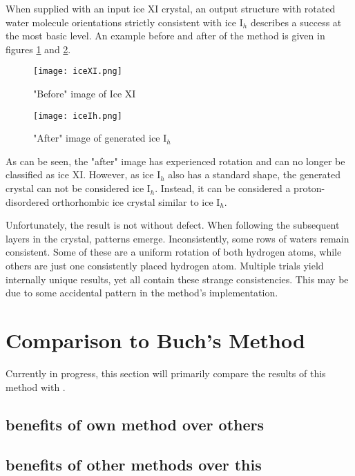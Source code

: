 When supplied with an input ice XI crystal, an output structure with rotated water molecule orientations strictly consistent with ice I$_{h}$ describes a success at the most basic level.
An example before and after of the method is given in figures \ref{fig:iceXI} and \ref{fig:iceIh}.
\begin{figure}
	
	\centering
	
	\texttt{[image: iceXI.png]}
	
	\caption{"Before" image of Ice XI}
	
	\label{fig:iceXI}
	
\end{figure}
\begin{figure}
	
	\centering
	
	\texttt{[image: iceIh.png]}
	
	\caption{"After" image of generated ice I$_{h}$}
	
	\label{fig:iceIh}
	
\end{figure}
As can be seen, the "after" image has experienced rotation and can no longer be classified as ice XI. 
However, as ice I$_{h}$ also has a standard shape, the generated crystal can not be considered ice I$_{h}$.
Instead, it can be considered a proton-disordered orthorhombic ice crystal similar to ice I$_{h}$. 

Unfortunately, the result is not without defect.
When following the subsequent layers in the crystal, patterns emerge. 
Inconsistently, some rows of waters remain consistent.
Some of these are a uniform rotation of both hydrogen atoms, while others are just one consistently placed hydrogen atom.
Multiple trials yield internally unique results, yet all contain these strange consistencies.
This may be due to some accidental pattern in the method's implementation.

%
%
%
%
\section{Comparison to Buch's Method}
Currently in progress, this section will primarily compare the results of this method with \cite{MCIce}.
\subsection{benefits of own method over others}
\subsection{benefits of other methods over this}
%
%
%
%



